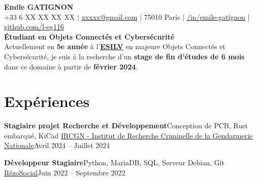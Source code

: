 \documentclass[letterpaper,11pt]{article}
\begin{document}
\begin{center}
  \textbf{\Huge Emile GATIGNON} \\ \vspace{1pt}
  +33 6 XX XX XX XX $|$ 
  \href{mailto:xxxxx@gmail.com}{xxxxx@gmail.com} $|$ 
  75010 Paris $|$ 
  \href{https://linkedin.com/in/emile-gatignon/}{\underline{/in/emile-gatignon}} $|$
  \href{https://github.com/l-eg16}{\underline{github.com/l-eg116}} \\
  \vspace{6pt}
  \textbf{\small{Étudiant en Objets Connectés et Cybersécurité}} \\
  Actuellement en \textbf{5e année} à l’\href{https://www.esilv.fr/}{\textbf{ESILV}} en majeure Objets Connectés et Cybersécurité, je suis à la recherche d’un \textbf{stage de fin d’études de 6 mois} dans ce domaine à partir de \textbf{février 2024}.
\end{center}

\section{Expériences}
  \resumeSubHeadingListStart
    \resumeSubheading
      {\textbf{Stagiaire projet Recherche et Développement}}{Conception de PCB, Rust embarqué, KiCad}
      {\href{https://www.gendarmerie.interieur.gouv.fr/pjgn/institut-de-recherche-criminelle-de-la-gendarmerie-nationale}{IRCGN - Institut de Recherche Criminelle de la Gendarmerie Nationale}}{Avril 2024 -- Juillet 2024}
      \resumeItemListStart
      \resumeItemListEnd

    \resumeSubheading
      {\textbf{Développeur Stagiaire}}{Python, MariaDB, SQL, Serveur Debian, Git}
      {\href{https://rezosocial.org/}{RézoSocial}}{Juin 2022 -- Septembre 2022}
      \resumeItemListStart
      \resumeItemListEnd
\end{document}

